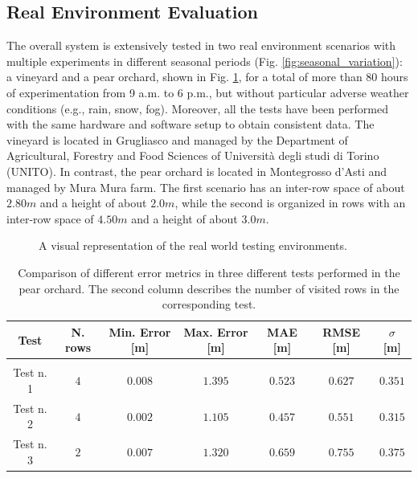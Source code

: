 \documentclass[journal]{IEEEtran}
\begin{document}
\subsection{Real Environment Evaluation}
The overall system is extensively tested in two real environment scenarios with multiple experiments in different seasonal periods (Fig. \ref{fig:seasonal_variation}): a vineyard and a pear orchard, shown in Fig. \ref{fig:real_env_example}, for a total of more than 80 hours of experimentation from 9 a.m. to 6 p.m., but without particular adverse weather conditions (e.g., rain, snow, fog). Moreover, all the tests have been performed with the same hardware and software setup to obtain consistent data. The vineyard is located in Grugliasco and managed by the Department of Agricultural, Forestry and Food Sciences of Università degli studi di Torino (UNITO). In contrast, the pear orchard is located in Montegrosso d'Asti and managed by Mura Mura farm. The first scenario has an inter-row space of about $2.80m$ and a height of about $2.0 m$, while the second is organized in rows with an inter-row space of $4.50m$ and a height of about $3.0m$.

\begin{figure}[!h]
\centering
{}
\hfil
{}
\caption{A visual representation of the real world testing environments.}
\label{fig:real_env_example}
\end{figure}

\begin{table}[h]
\caption{Comparison of different error metrics in three different tests performed in the pear orchard. The second column describes the number of visited rows in the corresponding test.}
\centering
\begin{tabular}{ccccccc}
Test     & \parbox[c]{0.8cm}{\centering N. rows} & \parbox[c]{0.8cm}{\centering Min. Error [m]}  & \parbox[c]{0.8cm}{\centering Max. Error [m]} & \parbox[c]{0.8cm} {\centering MAE [m]} & \parbox[c]{0.8cm} {\centering RMSE [m]} & \parbox[c]{0.75cm} {\centering $\sigma$ [m]}\\
\hline
\\
Test n. 1    & $4$ & $0.008$ & $1.395$ & $0.523$ & $0.627$ & $0.351$\\

Test n. 2    & $4$ & $0.002$ & $1.105$ & $0.457$ & $0.551$ & $0.315$\\

Test n. 3    & $2$ & $0.007$ & $1.320$ & $0.659$ & $0.755$ & $0.375$\\
\hline
           
\end{tabular}
\label{pear_orch_test}
\end{table}
\end{document}
